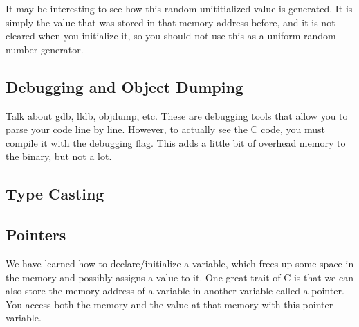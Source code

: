 \documentclass{article}
\begin{document}
  It may be interesting to see how this random unititialized value is generated. It is simply the value that was stored in that memory address before, and it is not cleared when you initialize it, so you should not use this as a uniform random number generator. 


  \subsection{Debugging and Object Dumping} 

    Talk about gdb, lldb, objdump, etc. These are debugging tools that allow you to parse your code line by line. However, to actually see the C code, you must compile it with the debugging flag. This adds a little bit of overhead memory to the binary, but not a lot. 

  \subsection{Type Casting}


  \subsection{Pointers}

    We have learned how to declare/initialize a variable, which frees up some space in the memory and possibly assigns a value to it. One great trait of C is that we can also store the memory address of a variable in another variable called a pointer. You access both the memory and the value at that memory with this pointer variable. 
\end{document}
